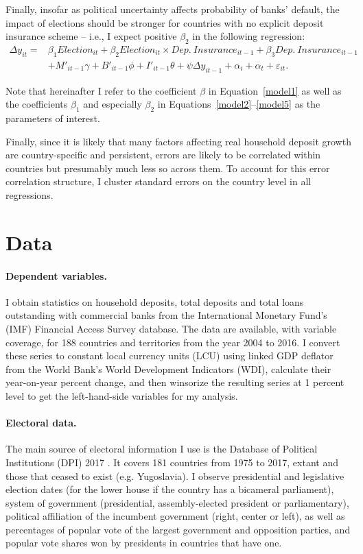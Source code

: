 \documentclass[12pt,a4paper]{article}
\begin{document}
Finally, insofar as political uncertainty affects probability of banks' default, the impact of elections should be stronger for countries with no explicit deposit insurance scheme -- i.e., I expect positive $\beta_2$ in the following regression:
\begin{equation}\label{model5}
\begin{split}
\Delta y_{it} = &\beta_1 Election_{it} + \beta_2 Election_{it} \times Dep.\ Insurance_{it-1} + \beta_3 Dep.\ Insurance_{it-1} \\
&+ M'_{it-1}\gamma + B'_{it-1}\phi + I'_{it-1} \theta + \psi \Delta y_{it-1} + \alpha_i + \alpha_t + \varepsilon_{it}.
\end{split}
\end{equation}

Note that hereinafter I refer to the coefficient $\beta$ in Equation~\eqref{model1} as well as the coefficients $\beta_1$ and especially $\beta_2$ in Equations~\eqref{model2}--\eqref{model5} as the parameters of interest.

Finally, since it is likely that many factors affecting real household deposit growth are country-specific and persistent, errors are likely to be correlated within countries but presumably much less so across them. To account for this error correlation structure, I cluster standard errors on the country level in all regressions.

\section{Data}\label{data}
\paragraph{Dependent variables.}
I obtain statistics on household deposits, total deposits and total loans outstanding with commercial banks from the International Monetary Fund's (IMF) Financial Access Survey database. The data are available, with variable coverage, for 188 countries and territories from the year 2004 to 2016. I convert these series to constant local currency units (LCU) using linked GDP deflator from the World Bank's World Development Indicators (WDI), calculate their year-on-year percent change, and then winsorize the resulting series at 1 percent level to get the left-hand-side variables for my analysis.

\paragraph{Electoral data.}
The main source of electoral information I use is the Database of Political Institutions (DPI) 2017 \citep{dpi2017}. It covers 181 countries from 1975 to 2017, extant and those that ceased to exist (e.g. Yugoslavia). I observe presidential and legislative election dates (for the lower house if the country has a bicameral parliament), system of government (presidential, assembly-elected president or parliamentary), political affiliation of the incumbent government (right, center or left), as well as percentages of popular vote of the largest government and opposition parties, and popular vote shares won by presidents in countries that have one.
\end{document}
